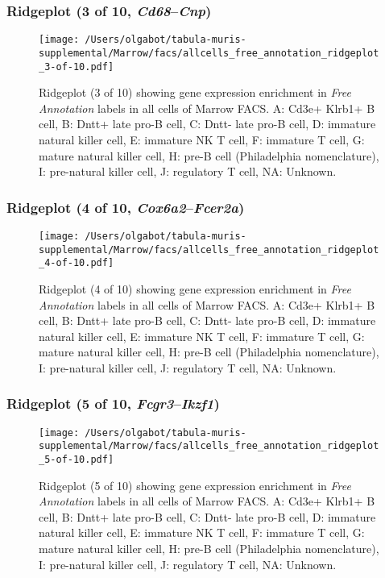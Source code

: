 \clearpage

\subsubsection{Ridgeplot (3 of 10, \emph{Cd68}--\emph{Cnp})}
\begin{figure}[h]
\centering
\texttt{[image: /Users/olgabot/tabula-muris-supplemental/Marrow/facs/allcells\_free\_annotation\_ridgeplot\_3-of-10.pdf]}

\caption{ Ridgeplot (3 of 10)  showing gene expression enrichment in \emph{Free Annotation} labels in all cells of Marrow FACS. A: Cd3e+ Klrb1+ B cell, B: Dntt+ late pro-B cell, C: Dntt- late pro-B cell, D: immature natural killer cell, E: immature NK T cell, F: immature T cell, G: mature natural killer cell, H: pre-B cell (Philadelphia nomenclature), I: pre-natural killer cell, J: regulatory T cell, NA: Unknown.}
\end{figure}


\clearpage

\subsubsection{Ridgeplot (4 of 10, \emph{Cox6a2}--\emph{Fcer2a})}
\begin{figure}[h]
\centering
\texttt{[image: /Users/olgabot/tabula-muris-supplemental/Marrow/facs/allcells\_free\_annotation\_ridgeplot\_4-of-10.pdf]}

\caption{ Ridgeplot (4 of 10)  showing gene expression enrichment in \emph{Free Annotation} labels in all cells of Marrow FACS. A: Cd3e+ Klrb1+ B cell, B: Dntt+ late pro-B cell, C: Dntt- late pro-B cell, D: immature natural killer cell, E: immature NK T cell, F: immature T cell, G: mature natural killer cell, H: pre-B cell (Philadelphia nomenclature), I: pre-natural killer cell, J: regulatory T cell, NA: Unknown.}
\end{figure}


\clearpage

\subsubsection{Ridgeplot (5 of 10, \emph{Fcgr3}--\emph{Ikzf1})}
\begin{figure}[h]
\centering
\texttt{[image: /Users/olgabot/tabula-muris-supplemental/Marrow/facs/allcells\_free\_annotation\_ridgeplot\_5-of-10.pdf]}

\caption{ Ridgeplot (5 of 10)  showing gene expression enrichment in \emph{Free Annotation} labels in all cells of Marrow FACS. A: Cd3e+ Klrb1+ B cell, B: Dntt+ late pro-B cell, C: Dntt- late pro-B cell, D: immature natural killer cell, E: immature NK T cell, F: immature T cell, G: mature natural killer cell, H: pre-B cell (Philadelphia nomenclature), I: pre-natural killer cell, J: regulatory T cell, NA: Unknown.}
\end{figure}


